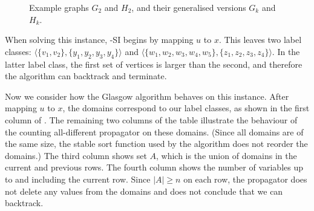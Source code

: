 \begin{figure}[h!]
{{        }
        \label{figure:gac-example-1}
    }
    \caption{Example graphs $G_2$ and $H_2$, and their generalised
    versions $G_k$ and $H_k$.}\label{figure:gac-example}
\end{figure}

When solving this instance, \McSplit-SI begins by mapping $u$ to $x$.  This leaves
two label classes:
$\langle \{v_1,v_2\}, \{y_1,y_2,y_3,y_4\} \rangle$
and
$\langle \{w_1,w_2,w_3,w_4,w_5\}, \{z_1,z_2,z_3,z_4\} \rangle$.  In the latter
label class, the first set of vertices is larger than the second, and therefore the
algorithm can backtrack and terminate.

Now we consider how the Glasgow algorithm behaves on this instance. After mapping
$u$ to $x$, the domains correspond to our label classes, as shown in the first
column of .  The remaining two columns of the table
illustrate the behaviour of the counting all-different propagator on these domains.
(Since all domains are of the same size, the stable sort function used by the algorithm
does not reorder the domains.)  The third column shows set $A$, which is the union
of domains in the current and previous rows.  The fourth column shows the number
of variables up to and including the current row.  Since $|A| \geq n$ on each row,
the propagator does not delete any values from the domains and does not conclude
that we can backtrack.

